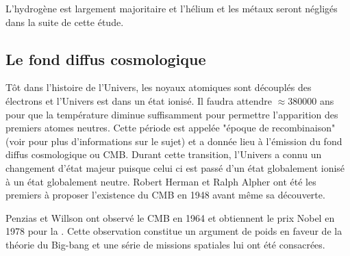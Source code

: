 L'hydrogène est largement majoritaire et l'hélium et les métaux seront négligés dans la suite de cette étude.

\subsection{Le fond diffus cosmologique}
\label{sec:CMB}

Tôt dans l'histoire de l'Univers, les noyaux atomiques sont découplés des électrons et l'Univers est dans un état ionisé. %
Il faudra attendre $\approx 380 000$ ans pour que la température diminue suffisamment pour permettre l'apparition des premiers atomes neutres.
Cette période est appelée "époque de recombinaison" (voir \cite{2009AN....330..657S} pour plus d'informations sur le sujet) et a donnée lieu à l'émission du fond diffus cosmologique ou \ac{CMB}.
Durant cette transition, l'Univers a connu un changement d'état majeur puisque celui ci est passé d'un état globalement ionisé à un état globalement neutre.
Robert Herman et Ralph Alpher ont été les premiers à proposer l’existence du \ac{CMB} en 1948 avant même sa découverte.
%
%

Penzias et Willson ont observé le \ac{CMB} en 1964 et obtiennent le prix Nobel en 1978 pour la \cite{PenziasWilsonNobel}.
Cette observation constitue un argument de poids en faveur de la théorie du Big-bang et une série de missions spatiales lui ont été consacrées.

